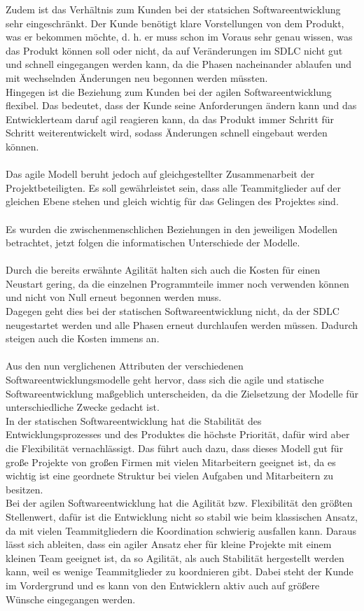 \documentclass[a4paper, 10pt]{scrartcl}
\begin{document}
Zudem ist das Verhältnis zum Kunden bei der statsichen Softwareentwicklung sehr eingeschränkt. Der Kunde benötigt klare Vorstellungen von dem Produkt, was er bekommen möchte, d. h. er muss schon im Voraus sehr genau wissen, was das Produkt können soll oder nicht, da auf Veränderungen im SDLC nicht gut und schnell eingegangen werden kann, da die Phasen nacheinander ablaufen und mit wechselnden Änderungen neu begonnen werden müssten.\\
Hingegen ist die Beziehung zum Kunden bei der agilen Softwareentwicklung flexibel. Das bedeutet, dass der Kunde seine Anforderungen ändern kann und das Entwicklerteam daruf agil reagieren kann, da das Produkt immer Schritt für Schritt weiterentwickelt wird, sodass Änderungen schnell eingebaut werden können.\\\\
Das agile Modell beruht jedoch auf gleichgestellter Zusammenarbeit der Projektbeteiligten. Es soll gewährleistet sein, dass alle Teammitglieder auf der gleichen Ebene stehen und gleich wichtig für das Gelingen des Projektes sind.\\\\
Es wurden die zwischenmenschlichen Beziehungen in den jeweiligen Modellen betrachtet, jetzt folgen die informatischen Unterschiede der Modelle.\\\\
Durch die bereits erwähnte Agilität halten sich auch die Kosten für einen Neustart gering, da die einzelnen Programmteile immer noch verwenden können und nicht \glqq von Null\grqq{} erneut begonnen werden muss.\\
Dagegen geht dies bei der statischen Softwareentwicklung nicht, da der SDLC neugestartet werden und alle Phasen erneut durchlaufen werden müssen. Dadurch steigen auch die Kosten immens an.\\\\
Aus den nun verglichenen Attributen der verschiedenen Softwareentwicklungsmodelle geht hervor, dass sich die agile und statische Softwareentwicklung maßgeblich unterscheiden, da die Zielsetzung der Modelle für unterschiedliche Zwecke gedacht ist.\\
In der statischen Softwareentwicklung hat die Stabilität des Entwicklungsprozesses und des Produktes die höchste Priorität, dafür wird aber die Flexibilität vernachlässigt. Das führt auch dazu, dass dieses Modell gut für große Projekte von großen Firmen mit vielen Mitarbeitern geeignet ist, da es wichtig ist eine geordnete Struktur bei vielen Aufgaben und Mitarbeitern zu besitzen.\\
Bei der agilen Softwareentwicklung hat die Agilität bzw. Flexibilität den größten Stellenwert, dafür ist die Entwicklung nicht so stabil wie beim klassischen Ansatz, da mit vielen Teammitgliedern die Koordination schwierig ausfallen kann. Daraus lässt sich ableiten, dass ein agiler Ansatz eher für kleine Projekte mit einem kleinen Team geeignet ist, da so Agilität, als auch Stabilität hergestellt werden kann, weil es wenige Teammitglieder zu koordnieren gibt. Dabei steht der Kunde im Vordergrund und es kann von den Entwicklern aktiv auch auf größere Wünsche eingegangen werden.
\end{document}
